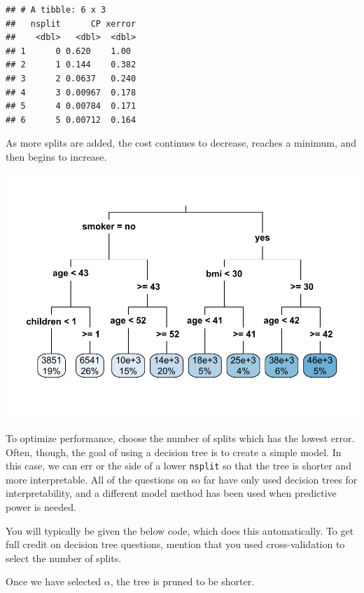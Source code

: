 \documentclass[]{book}
\newenvironment{Shaded}{\begin{snugshade}}{\end{snugshade}}
\newcommand{\DataTypeTok}[1]{\textcolor[rgb]{0.13,0.29,0.53}{#1}}
\newcommand{\DecValTok}[1]{\textcolor[rgb]{0.00,0.00,0.81}{#1}}
\newcommand{\KeywordTok}[1]{\textcolor[rgb]{0.13,0.29,0.53}{\textbf{#1}}}
\newcommand{\NormalTok}[1]{#1}
\newcommand{\OperatorTok}[1]{\textcolor[rgb]{0.81,0.36,0.00}{\textbf{#1}}}
\newcommand{\StringTok}[1]{\textcolor[rgb]{0.31,0.60,0.02}{#1}}
\begin{document}
\begin{verbatim}
## # A tibble: 6 x 3
##   nsplit      CP xerror
##    <dbl>   <dbl>  <dbl>
## 1      0 0.620    1.00 
## 2      1 0.144    0.382
## 3      2 0.0637   0.240
## 4      3 0.00967  0.178
## 5      4 0.00784  0.171
## 6      5 0.00712  0.164
\end{verbatim}

As more splits are added, the cost continues to decrease, reaches a minimum, and then begins to increase.

\includegraphics{Exam-PA-Study-Manual_files/figure-latex/unnamed-chunk-120-1.pdf}

To optimize performance, choose the number of splits which has the lowest error. Often, though, the goal of using a decision tree is to create a simple model. In this case, we can err or the side of a lower \texttt{nsplit} so that the tree is shorter and more interpretable. All of the questions on so far have only used decision trees for interpretability, and a different model method has been used when predictive power is needed.

You will typically be given the below code, which does this automatically. To get full credit on decision tree questions, mention that you used cross-validation to select the number of splits.

Once we have selected \(\alpha\), the tree is pruned to be shorter.

\begin{Shaded}
\end{Shaded}
\end{document}
